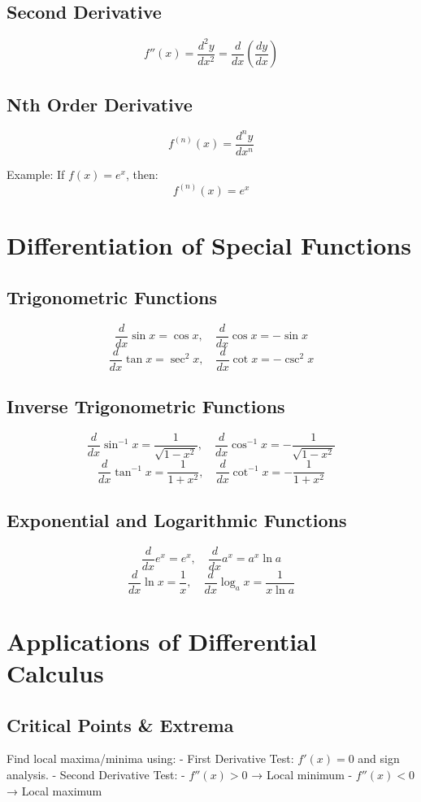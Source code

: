 \documentclass{article}
\begin{document}
\subsection{Second Derivative}
\[
f''(x) = \frac{d^2 y}{dx^2} = \frac{d}{dx} \left( \frac{dy}{dx} \right)
\]

\subsection{Nth Order Derivative}
\[
f^{(n)}(x) = \frac{d^n y}{dx^n}
\]

Example:  
If \( f(x) = e^x \), then:
\[
f^{(n)}(x) = e^x
\]

\newpage
\section{Differentiation of Special Functions}

\subsection{Trigonometric Functions}
\[
\frac{d}{dx} \sin x = \cos x, \quad \frac{d}{dx} \cos x = -\sin x
\]
\[
\frac{d}{dx} \tan x = \sec^2 x, \quad \frac{d}{dx} \cot x = -\csc^2 x
\]

\subsection{Inverse Trigonometric Functions}
\[
\frac{d}{dx} \sin^{-1} x = \frac{1}{\sqrt{1-x^2}}, \quad \frac{d}{dx} \cos^{-1} x = -\frac{1}{\sqrt{1-x^2}}
\]
\[
\frac{d}{dx} \tan^{-1} x = \frac{1}{1+x^2}, \quad \frac{d}{dx} \cot^{-1} x = -\frac{1}{1+x^2}
\]

\subsection{Exponential and Logarithmic Functions}
\[
\frac{d}{dx} e^x = e^x, \quad \frac{d}{dx} a^x = a^x \ln a
\]
\[
\frac{d}{dx} \ln x = \frac{1}{x}, \quad \frac{d}{dx} \log_a x = \frac{1}{x \ln a}
\]

\newpage
\section{Applications of Differential Calculus}
\subsection{Critical Points \& Extrema}
Find local maxima/minima using:
- First Derivative Test: \( f'(x) = 0 \) and sign analysis.
- Second Derivative Test:  
  - \( f''(x) > 0 \) → Local minimum
  - \( f''(x) < 0 \) → Local maximum
\end{document}
